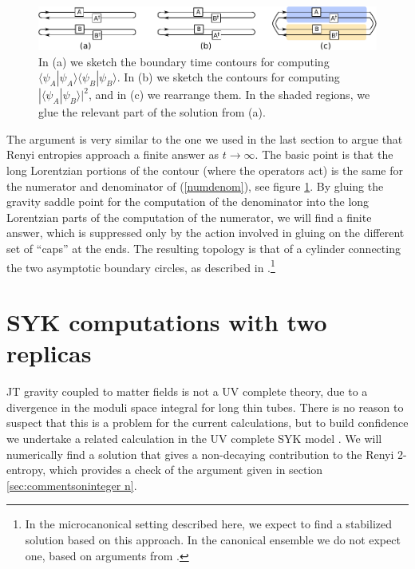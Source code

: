 \documentclass[12pt]{article}
\numberwithin{equation}{section}
\begin{document}
\begin{figure}[t]
\begin{center}
\includegraphics[width = \textwidth]{images/contours4.pdf}
\caption{{\small In (a) we sketch the boundary time contours for computing $\langle \psi_A|\psi_A\rangle\langle \psi_B|\psi_B\rangle$. In (b) we sketch the contours for computing $|\langle \psi_A|\psi_B\rangle|^2$, and in (c) we rearrange them. In the shaded regions, we glue the relevant part of the solution from (a).}}\label{fig:contours4}
\end{center}
\end{figure}
The argument is very similar to the one we used in the last section to argue that Renyi entropies approach a finite answer as $t\rightarrow \infty$. The basic point is that the long Lorentzian portions of the contour (where the operators act) is the same for the numerator and denominator of (\ref{numdenom}), see figure \ref{fig:contours4}. By gluing the gravity saddle point for the computation of the denominator into the long Lorentzian parts of the computation of the numerator, we will find a finite answer, which is suppressed only by the action involved in gluing on the different set of ``caps'' at the ends. The resulting topology is that of a cylinder connecting the two asymptotic boundary circles, as described in \cite{Saad:2019pqd}.\footnote{In the microcanonical setting described here, we expect to find a stabilized solution based on this approach. In the canonical ensemble we do not expect one, based on arguments from \cite{Saad:2018bqo,Saad:2019pqd}.}




\section{SYK computations with two replicas}\label{sec:SYK}
JT gravity coupled to matter fields is not a UV complete theory, due to a divergence in the moduli space integral for long thin tubes. There is no reason to suspect that this is a  problem for the current calculations, but to build confidence we undertake a related calculation in the UV complete SYK model \cite{Sachdev:1992fk,KitaevTalks,Kitaev:2017awl}. We will numerically find a solution that gives a non-decaying contribution to the Renyi 2-entropy, which provides a check of the argument given in section \ref{sec:commentsoninteger n}.
\end{document}

